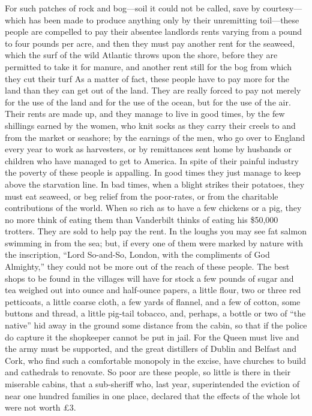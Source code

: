 \documentclass{book}
\begin{document}
For such patches of rock and bog—soil it could not be called, save by courtesy—which has been made to produce anything only by their unremitting toil—these people are compelled to pay their absentee landlords rents varying from a pound to four pounds per acre, and then they must pay another rent for the seaweed, which the surf of the wild Atlantic throws upon the shore, before they are permitted to take it for manure, and another rent still for the bog from which they cut their turf As a matter of fact, these people have to pay more for the land than they can get out of the land. They are really forced to pay not merely for the use of the land and for the use of the ocean, but for the use of the air. Their rents are made up, and they manage to live in good times, by the few shillings earned by the women, who knit socks as they carry their creels to and from the market or seashore; by the earnings of the men, who go over to England every year to work as harvesters, or by remittances sent home by husbands or children who have managed to get to America. In spite of their painful industry the poverty of these people is appalling. In good times they just manage to keep above the starvation line. In bad times, when a blight strikes their potatoes, they must eat seaweed, or beg relief from the poor-rates, or from the charitable contributions of the world. When so rich as to have a few chickens or a pig, they no more think of eating them than Vanderbilt thinks of eating his \$50,000 trotters. They are sold to help pay the rent. In the loughs you may see fat salmon swimming in from the sea; but, if every one of them were marked by nature with the inscription, “Lord So-and-So, London, with the compliments of God Almighty,” they could not be more out of the reach of these people. The best shops to be found in the villages will have for stock a few pounds of sugar and tea weighed out into ounce and half-ounce papers, a little flour, two or three red petticoats, a little coarse cloth, a few yards of flannel, and a few of cotton, some buttons and thread, a little pig-tail tobacco, and, perhaps, a bottle or two of “the native” hid away in the ground some distance from the cabin, so that if the police do capture it the shopkeeper cannot be put in jail. For the Queen must live and the army must be supported, and the great distillers of Dublin and Belfast and Cork, who find such a comfortable monopoly in the excise, have churches to build and cathedrals to renovate. So poor are these people, so little is there in their miserable cabins, that a sub-sheriff who, last year, superintended the eviction of near one hundred families in one place, declared that the effects of the whole lot were not worth £3.
\end{document}
